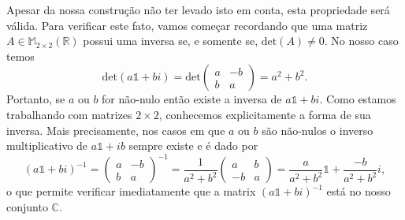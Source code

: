 Apesar da nossa construção
não ter levado isto em conta, esta propriedade será válida. Para verificar este fato, vamos começar 
recordando que uma matriz $A\in \mathbb{M}_{2\times 2}(\mathbb{R})$  possui uma inversa se, e somente se,
$\mbox{det}(A)\neq 0$. No nosso caso temos
\[
\mbox{det}(a\mathds{1}+ bi) 
= 
\mbox{det}
\begin{pmatrix}
a&-b\\
b&a
\end{pmatrix}
=
a^2+b^2.
\]
Portanto, se $a$ ou $b$ for não-nulo então existe a inversa de $a\mathds{1}+ bi$. 
Como estamos trabalhando com matrizes $2\times 2$, conhecemos explicitamente a forma de sua inversa.
Mais precisamente, nos casos em que $a$ ou $b$ são não-nulos o inverso multiplicativo de $a\mathds{1}+ib$
sempre existe e é dado por
\[
(a\mathds{1}+ bi)^{-1} 
= 
\begin{pmatrix}
a&-b\\
b&a
\end{pmatrix}^{-1}
=
\frac{1}{a^2+b^2}
\begin{pmatrix}
a&b\\
-b&a
\end{pmatrix}
=
\frac{a}{a^2+b^2}\mathds{1}
+
\frac{-b}{a^2+b^2}i,
\]
o que permite verificar imediatamente que a matrix $(a\mathds{1}+ bi)^{-1}$ 
está no nosso conjunto $\mathbb{C}$. 


